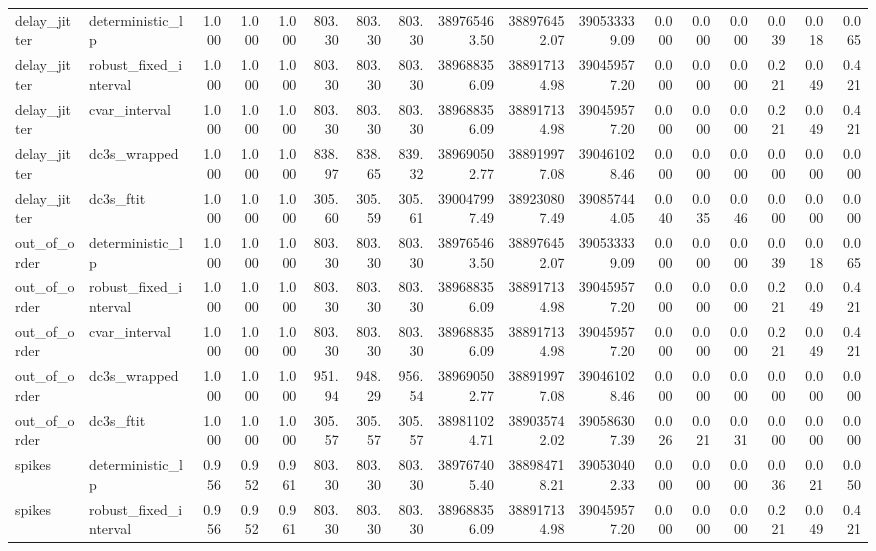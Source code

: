 \begin{tabular}{llrrrrrrrrrrrrrrr}
delay\_jitter & deterministic\_lp & 1.000 & 1.000 & 1.000 & 803.30 & 803.30 & 803.30 & 389765463.50 & 388976452.07 & 390533339.09 & 0.000 & 0.000 & 0.000 & 0.039 & 0.018 & 0.065 \\
delay\_jitter & robust\_fixed\_interval & 1.000 & 1.000 & 1.000 & 803.30 & 803.30 & 803.30 & 389688356.09 & 388917134.98 & 390459577.20 & 0.000 & 0.000 & 0.000 & 0.221 & 0.049 & 0.421 \\
delay\_jitter & cvar\_interval & 1.000 & 1.000 & 1.000 & 803.30 & 803.30 & 803.30 & 389688356.09 & 388917134.98 & 390459577.20 & 0.000 & 0.000 & 0.000 & 0.221 & 0.049 & 0.421 \\
delay\_jitter & dc3s\_wrapped & 1.000 & 1.000 & 1.000 & 838.97 & 838.65 & 839.32 & 389690502.77 & 388919977.08 & 390461028.46 & 0.000 & 0.000 & 0.000 & 0.000 & 0.000 & 0.000 \\
delay\_jitter & dc3s\_ftit & 1.000 & 1.000 & 1.000 & 305.60 & 305.59 & 305.61 & 390047997.49 & 389230807.49 & 390857444.05 & 0.040 & 0.035 & 0.046 & 0.000 & 0.000 & 0.000 \\
out\_of\_order & deterministic\_lp & 1.000 & 1.000 & 1.000 & 803.30 & 803.30 & 803.30 & 389765463.50 & 388976452.07 & 390533339.09 & 0.000 & 0.000 & 0.000 & 0.039 & 0.018 & 0.065 \\
out\_of\_order & robust\_fixed\_interval & 1.000 & 1.000 & 1.000 & 803.30 & 803.30 & 803.30 & 389688356.09 & 388917134.98 & 390459577.20 & 0.000 & 0.000 & 0.000 & 0.221 & 0.049 & 0.421 \\
out\_of\_order & cvar\_interval & 1.000 & 1.000 & 1.000 & 803.30 & 803.30 & 803.30 & 389688356.09 & 388917134.98 & 390459577.20 & 0.000 & 0.000 & 0.000 & 0.221 & 0.049 & 0.421 \\
out\_of\_order & dc3s\_wrapped & 1.000 & 1.000 & 1.000 & 951.94 & 948.29 & 956.54 & 389690502.77 & 388919977.08 & 390461028.46 & 0.000 & 0.000 & 0.000 & 0.000 & 0.000 & 0.000 \\
out\_of\_order & dc3s\_ftit & 1.000 & 1.000 & 1.000 & 305.57 & 305.57 & 305.57 & 389811024.71 & 389035742.02 & 390586307.39 & 0.026 & 0.021 & 0.031 & 0.000 & 0.000 & 0.000 \\
spikes & deterministic\_lp & 0.956 & 0.952 & 0.961 & 803.30 & 803.30 & 803.30 & 389767405.40 & 388984718.21 & 390530402.33 & 0.000 & 0.000 & 0.000 & 0.036 & 0.021 & 0.050 \\
spikes & robust\_fixed\_interval & 0.956 & 0.952 & 0.961 & 803.30 & 803.30 & 803.30 & 389688356.09 & 388917134.98 & 390459577.20 & 0.000 & 0.000 & 0.000 & 0.221 & 0.049 & 0.421 \\

\end{tabular}

